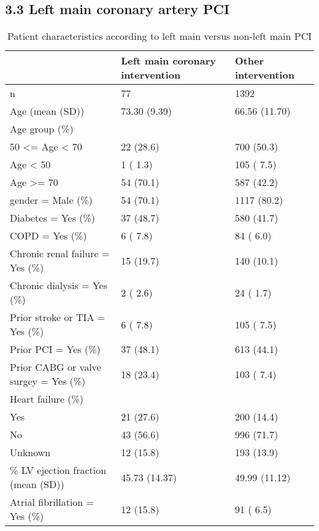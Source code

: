 \documentclass[
]{article}
\begin{document}
\hypertarget{left-main-coronary-artery-pci}{%
\subsection{3.3 Left main coronary artery
PCI}\label{left-main-coronary-artery-pci}}

\begin{longtable}[t]{lll}
\caption{\label{tab:table 34}Patient characteristics according to left main versus non-left main PCI}\\
\toprule
 & Left main coronary intervention & Other intervention\\
\midrule
n & 77 & 1392\\
Age (mean (SD)) & 73.30 (9.39) & 66.56 (11.70)\\
Age group (\%) &  & \\
\hspace{1em}50 <= Age < 70 & 22 (28.6) & 700 (50.3)\\
\hspace{1em}Age < 50 & 1 ( 1.3) & 105 ( 7.5)\\
\addlinespace
\hspace{1em}Age >= 70 & 54 (70.1) & 587 (42.2)\\
gender = Male (\%) & 54 (70.1) & 1117 (80.2)\\
Diabetes = Yes (\%) & 37 (48.7) & 580 (41.7)\\
COPD = Yes (\%) & 6 ( 7.8) & 84 ( 6.0)\\
Chronic renal failure = Yes (\%) & 15 (19.7) & 140 (10.1)\\
\addlinespace
Chronic dialysis = Yes (\%) & 2 ( 2.6) & 24 ( 1.7)\\
Prior stroke or TIA = Yes (\%) & 6 ( 7.8) & 105 ( 7.5)\\
Prior PCI = Yes (\%) & 37 (48.1) & 613 (44.1)\\
Prior CABG or valve surgey = Yes (\%) & 18 (23.4) & 103 ( 7.4)\\
Heart failure (\%) &  & \\
\addlinespace
\hspace{1em}Yes & 21 (27.6) & 200 (14.4)\\
\hspace{1em}No & 43 (56.6) & 996 (71.7)\\
\hspace{1em}Unknown & 12 (15.8) & 193 (13.9)\\
\% LV ejection fraction (mean (SD)) & 45.73 (14.37) & 49.99 (11.12)\\
Atrial fibrillation = Yes (\%) & 12 (15.8) & 91 ( 6.5)\\
\bottomrule
\end{longtable}
\end{document}
